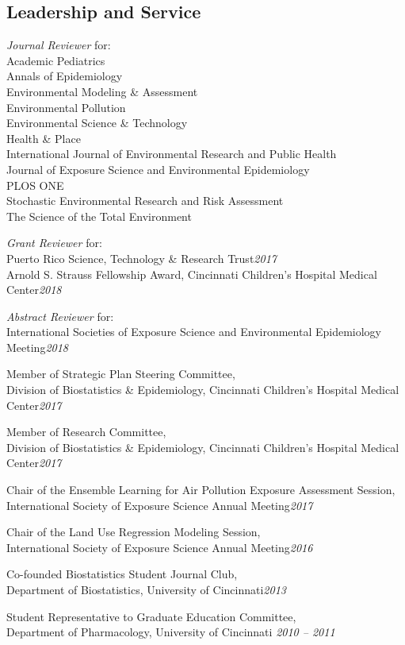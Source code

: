 \documentclass[margin,line]{res}
\newenvironment{list3}{
  \begin{list}{}{%
      \setlength{\itemsep}{0in}
      \setlength{\parsep}{0in} \setlength{\parskip}{0in}
      \setlength{\topsep}{0in} \setlength{\partopsep}{0in}
      \setlength{\leftmargin}{0in}}}{\end{list}}
\begin{document}
\begin{resume}
\section{\sc Leadership and Service}
\begin{list3} \itemsep 4pt
\item[] \textit{Journal Reviewer} for: \\
        Academic Pediatrics \\
        Annals of Epidemiology \\
        Environmental Modeling \& Assessment \\
        Environmental Pollution \\
        Environmental Science \& Technology \\
        Health \& Place \\
        International Journal of Environmental Research and Public Health \\
        Journal of Exposure Science and Environmental Epidemiology \\
        PLOS ONE \\
        Stochastic Environmental Research and Risk Assessment \\
        The Science of the Total Environment
\item[] \textit{Grant Reviewer} for: \\
        Puerto Rico Science, Technology \& Research Trust\hfill \textit{2017}\\
        Arnold S. Strauss Fellowship Award, Cincinnati Children's Hospital
        Medical Center\hfill \textit{2018}
\item[] \textit{Abstract Reviewer} for: \\
        International Societies of Exposure Science and Environmental Epidemiology Meeting\hfill \textit{2018}
\item[] Member of Strategic Plan Steering Committee, \\Division of Biostatistics \& Epidemiology, Cincinnati Children's Hospital Medical Center\hfill \textit{2017}
\item[] Member of Research Committee, \\Division of Biostatistics \& Epidemiology, Cincinnati Children's Hospital Medical Center\hfill \textit{2017}
\item[] Chair of the Ensemble Learning for Air Pollution Exposure Assessment Session, \\International Society of Exposure Science Annual Meeting\hfill \textit{2017}
\item[] Chair of the Land Use Regression Modeling Session, \\International Society of Exposure Science Annual Meeting\hfill \textit{2016}
\item[] Co-founded Biostatistics Student Journal Club, \\Department of Biostatistics, University of Cincinnati\hfill \textit{2013}
\item[] Student Representative to Graduate Education Committee, \\Department of Pharmacology, University of Cincinnati \hfill \textit{2010 -- 2011}
\end{list3}


\end{resume}
\end{document}
